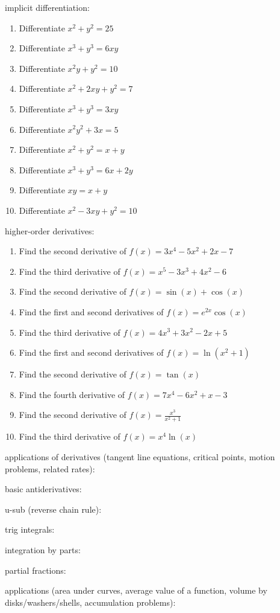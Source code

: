 \documentclass{article}
\begin{document}
implicit differentiation:
\begin{enumerate}
        \item Differentiate $x^2 + y^2 = 25$
        \item Differentiate $x^3 + y^3 = 6xy$
        \item Differentiate $x^2y + y^2 = 10$
        \item Differentiate $x^2 + 2xy + y^2 = 7$
        \item Differentiate $x^3 + y^3 = 3xy$
        \item Differentiate $x^2y^2 + 3x = 5$
        \item Differentiate $x^2 + y^2 = x + y$
        \item Differentiate $x^3 + y^3 = 6x + 2y$
        \item Differentiate $xy = x + y$
        \item Differentiate $x^2 - 3xy + y^2 = 10$
\end{enumerate}

higher-order derivatives:
\begin{enumerate}
        \item Find the second derivative of $f(x) = 3x^4 - 5x^2 + 2x - 7$
        \item Find the third derivative of $f(x) = x^5 - 3x^3 + 4x^2 - 6$
        \item Find the second derivative of $f(x) = \sin(x) + \cos(x)$
        \item Find the first and second derivatives of $f(x) = e^{2x} \cos(x)$
        \item Find the third derivative of $f(x) = 4x^3 + 3x^2 - 2x + 5$
        \item Find the first and second derivatives of $f(x) = \ln(x^2 + 1)$
        \item Find the second derivative of $f(x) = \tan(x)$
        \item Find the fourth derivative of $f(x) = 7x^4 - 6x^2 + x - 3$
        \item Find the second derivative of $f(x) = \frac{x^3}{x^2 + 1}$
        \item Find the third derivative of $f(x) = x^4 \ln(x)$
\end{enumerate}

applications of derivatives (tangent line equations, critical points, motion problems, related rates):

basic antiderivatives:

u-sub (reverse chain rule):

trig integrals:

integration by parts:

partial fractions:

applications (area under curves, average value of a function, volume by disks/washers/shells, accumulation problems):
\end{document}
